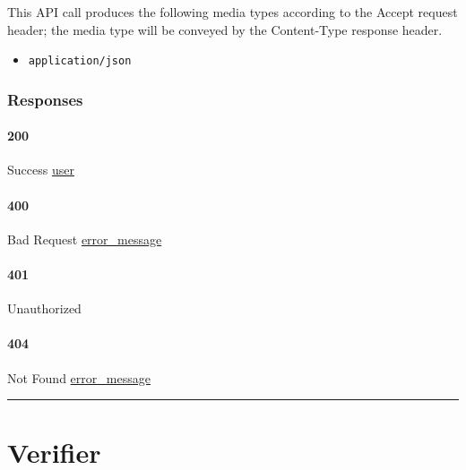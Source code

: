 This API call produces the following media types according to the
{Accept} request header; the media type will be conveyed by the
{Content-Type} response header.

\begin{itemize}
\tightlist
\item
  \texttt{application/json}
\end{itemize}

\hypertarget{responses-153}{%
\subsubsection{Responses}\label{responses-153}}

\hypertarget{section-492}{%
\paragraph{200}\label{section-492}}

Success \protect\hyperlink{user}{user}

\hypertarget{section-493}{%
\paragraph{400}\label{section-493}}

Bad Request \protect\hyperlink{error_message}{error\_message}

\hypertarget{section-494}{%
\paragraph{401}\label{section-494}}

Unauthorized \protect\hyperlink{}{}

\hypertarget{section-495}{%
\paragraph{404}\label{section-495}}

Not Found \protect\hyperlink{error_message}{error\_message}

\begin{center}\rule{0.5\linewidth}{\linethickness}\end{center}

\hypertarget{verifier-1}{%
\section{\texorpdfstring{\protect\hypertarget{Verifier}{}{Verifier}}{Verifier}}\label{verifier-1}}

